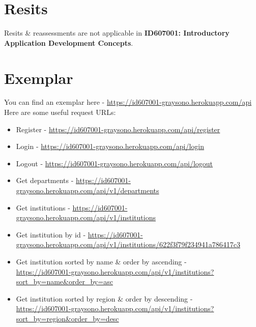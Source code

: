 \documentclass{article}
\begin{document}
\section*{Resits}
Resits \& reassessments are not applicable in \textbf{ID607001: Introductory Application Development Concepts}.

\newpage

\section*{Exemplar}
You can find an exemplar here - \small\href{https://id607001-graysono.herokuapp.com/api/v1}{https://id607001-graysono.herokuapp.com/api} \\

Here are some useful request URLs:
\begin{itemize}
	\item Register - \href{https://id607001-graysono.herokuapp.com/api/register}{https://id607001-graysono.herokuapp.com/api/register}
	\item Login - \href{https://id607001-graysono.herokuapp.com/api/login}{https://id607001-graysono.herokuapp.com/api/login}
	\item Logout - \href{https://id607001-graysono.herokuapp.com/api/logout}{https://id607001-graysono.herokuapp.com/api/logout}
	\item Get departments - \href{https://id607001-graysono.herokuapp.com/api/v1/departments}{https://id607001-graysono.herokuapp.com/api/v1/departments}
	\item Get institutions - \href{https://id607001-graysono.herokuapp.com/api/v1/institutions}{https://id607001-graysono.herokuapp.com/api/v1/institutions}
	\item Get institution by id - \href{https://id607001-graysono.herokuapp.com/api/v1/institutions/622f3f79f234941a786417c3}{https://id607001-graysono.herokuapp.com/api/v1/institutions/622f3f79f234941a786417c3}
	\item Get institution sorted by name \& order by ascending - \\ \href{https://id607001-graysono.herokuapp.com/api/v1/institutions?sort\_by=name\&order\_by=asc}{https://id607001-graysono.herokuapp.com/api/v1/institutions?sort\_by=name\&order\_by=asc}
	\item Get institution sorted by region \& order by descending - \\ \href{https://id607001-graysono.herokuapp.com/api/v1/institutions?sort\_by=region\&order\_by=desc}{https://id607001-graysono.herokuapp.com/api/v1/institutions?sort\_by=region\&order\_by=desc}

\end{itemize}
\end{document}
